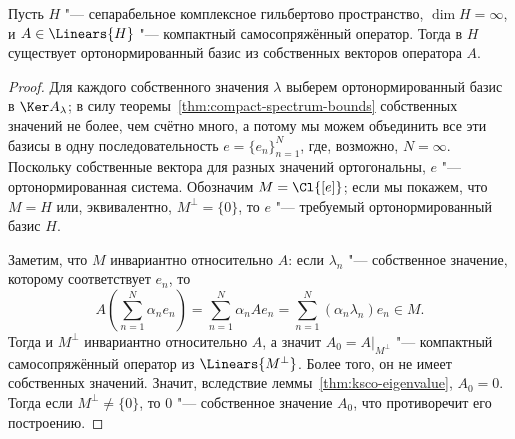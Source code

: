 \documentclass[main]{subfiles}
\begin{document}
\begin{theorem}
  Пусть \( H \) "--- сепарабельное комплексное гильбертово пространство,
  \( \dim H = \infty \), и
  \( A \in \Linears{H} \) "--- компактный самосопряжённый оператор.
  Тогда в \( H \) существует ортонормированный базис
  из собственных векторов оператора \( A \).
\end{theorem}
\begin{proof}
  Для каждого собственного значения \( \lambda \)
  выберем ортонормированный базис в \( \Ker A_\lambda \);
  в силу теоремы~\ref{thm:compact-spectrum-bounds}
  собственных значений не более, чем счётно много,
  а потому мы можем объединить все эти базисы
  в одну последовательность \( e = \{ e_n \}_{n=1}^N \),
  где, возможно, \( N = \infty \).
  Поскольку собственные вектора для разных значений
  ортогональны, \( e \) "--- ортонормированная система.
  Обозначим \( M = \Cl{[e]} \);
  если мы покажем, что \( M = H \) или,
  эквивалентно, \( M^\perp = \{ 0 \} \),
  то \( e \) "--- требуемый ортонормированный базис \( H \).

  Заметим, что \( M \) инвариантно относительно \( A \):
  если \( \lambda_n \) "--- собственное значение,
  которому соответствует \( e_n \), то
  \[
    A (\sum_{n=1}^N \alpha_n e_n) =
    \sum_{n=1}^N \alpha_n A e_n =
    \sum_{n=1}^N (\alpha_n \lambda_n) e_n \in M.
  \]
  Тогда и \( M^\perp \) инвариантно относительно \( A \),
  а значит \( A_0 = A \bigr|_{M^\perp} \) "---
  компактный самосопряжённый оператор из \( \Linears{M^\perp} \).
  Более того, он не имеет собственных значений.
  Значит, вследствие леммы~\ref{thm:ksco-eigenvalue},
  \( A_0 = 0 \).
  Тогда если \( M^\perp \ne \{ 0 \} \), то \( 0 \) "---
  собственное значение \( A_0 \),
  что противоречит его построению.
\end{proof}

\end{document}
